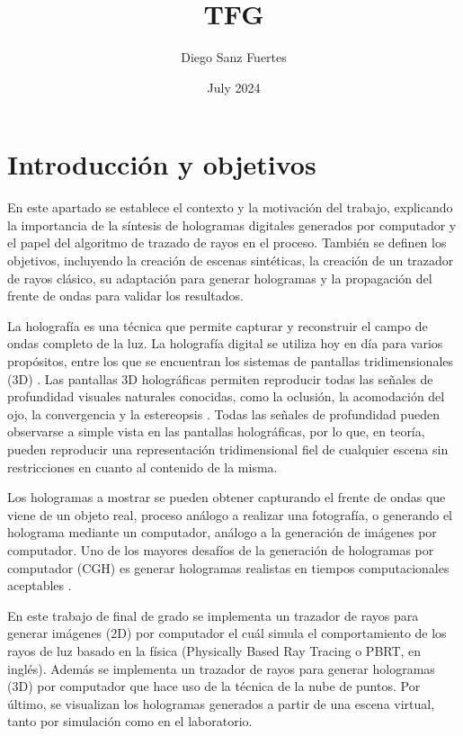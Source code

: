 \documentclass[10pt, a4paper]{article}
\title{TFG}
\author{Diego Sanz Fuertes}
\date{July 2024}
\begin{document}
\maketitle
\titlepage
\tableofcontents
\newpage

\section{Introducción y objetivos}

En este apartado se establece el contexto y la motivación del trabajo, explicando la importancia de la síntesis de hologramas digitales generados por computador y el papel del algoritmo de trazado de rayos en el proceso. También se definen los objetivos, incluyendo la creación de escenas sintéticas, la creación de un trazador de rayos clásico, su adaptación para generar hologramas y la propagación del frente de ondas para validar los resultados.

La holografía es una técnica que permite capturar y reconstruir el campo de ondas completo de la luz. \cite{Goodman:2017} La holografía digital se utiliza hoy en día para varios propósitos, entre los que se encuentran los sistemas de pantallas tridimensionales (3D) \cite{Blinder:2019}. Las pantallas 3D holográficas permiten reproducir todas las señales de profundidad visuales naturales conocidas, como la oclusión, la acomodación del ojo, la convergencia y la estereopsis \cite{Blinder:2022}. Todas las señales de profundidad pueden observarse a simple vista en las pantallas holográficas, por lo que, en teoría, pueden reproducir una representación tridimensional fiel de cualquier escena sin restricciones en cuanto al contenido de la misma.

Los hologramas a mostrar se pueden obtener capturando el frente de ondas que viene de un objeto real, proceso análogo a realizar una fotografía, o generando el holograma mediante un computador, análogo a la generación de imágenes por computador. Uno de los mayores desafíos de la generación de hologramas por computador (CGH) es generar hologramas realistas en tiempos computacionales aceptables \cite{Blinder:2019}.

En este trabajo de final de grado se implementa un trazador de rayos para generar imágenes (2D) por computador el cuál simula el comportamiento de los rayos de luz basado en la física (Physically Based Ray Tracing o PBRT, en inglés). Además se implementa un trazador de rayos para generar hologramas (3D) por computador que hace uso de la técnica de la nube de puntos. Por último, se visualizan los hologramas generados a partir de una escena virtual, tanto por simulación como en el laboratorio.
\end{document}
